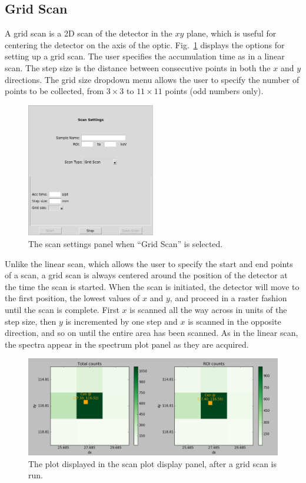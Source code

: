 \subsection{Grid Scan}

A grid scan is a 2D scan of the detector in the $xy$ plane, which is useful for centering the detector on the axis of the optic. Fig.~\ref{fig:gridscan} displays the options for setting up a grid scan. The user specifies the accumulation time as in a linear scan. The step size is the distance between consecutive points in both the $x$ and $y$ directions. The grid size dropdown menu allows the user to specify the number of points to be collected, from $3 \times 3$ to $11 \times 11$ points (odd numbers only).

\begin{figure}
\centering
\includegraphics[width=0.5\textwidth]{gridscan.png}
\caption{\label{fig:gridscan} The scan settings panel when ``Grid Scan'' is selected.}
\end{figure}

Unlike the linear scan, which allows the user to specify the start and end points of a scan, a grid scan is always centered around the position of the detector at the time the scan is started. When the scan is initiated, the detector will move to the first position, the lowest values of $x$ and $y$, and proceed in a raster fashion until the scan is complete. First $x$ is scanned all the way across in units of the step size, then $y$ is incremented by one step and $x$ is scanned in the opposite direction, and so on until the entire area has been scanned. As in the linear scan, the spectra appear in the spectrum plot panel as they are acquired.

\begin{figure}
\centering
\includegraphics[width=\textwidth]{gridplot.png}
\caption{\label{fig:gridplot} The plot displayed in the scan plot display panel, after a grid scan is run.}
\end{figure}

